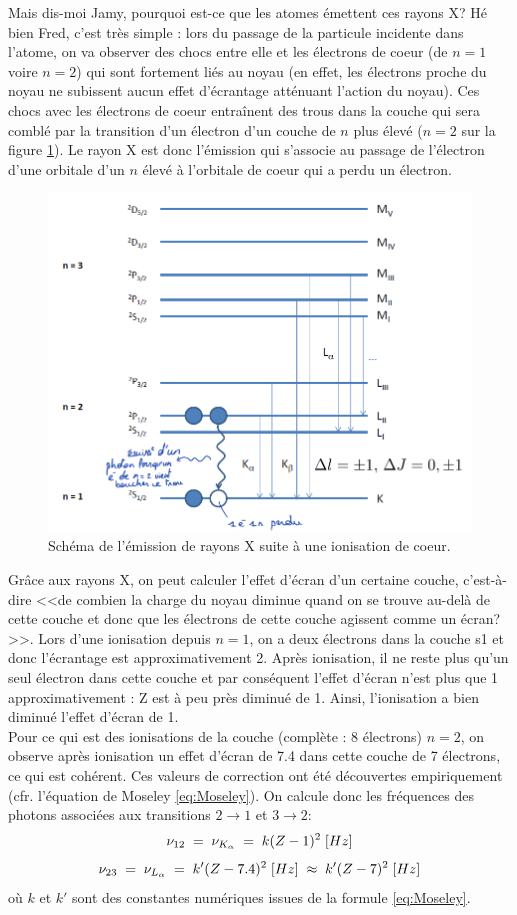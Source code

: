 Mais dis-moi Jamy, pourquoi est-ce que les atomes émettent ces rayons X? Hé bien Fred, c'est très simple : lors du passage de la particule incidente dans l'atome, on va observer des chocs entre elle et les électrons de coeur (de $n=1$ voire $n=2$) qui sont fortement liés au noyau (en effet, les électrons proche du noyau ne subissent aucun effet d'écrantage atténuant l'action du noyau). Ces chocs avec les électrons de coeur entraînent des trous dans la couche qui sera comblé par la transition d'un électron d'un couche de $n$ plus élevé ($n=2$ sur la figure \ref{fig:Rayons X}). Le rayon X est donc l'émission qui s'associe au passage de l'électron d'une orbitale d'un $n$ élevé à l'orbitale de coeur qui a perdu un électron.
\begin{figure}[tph]
    \centering
    \includegraphics[scale=0.8]{Images2/Rayons X.PNG}
    \caption{Schéma de l'émission de rayons X suite à une ionisation de coeur.}
    \label{fig:Rayons X}
\end{figure}
Grâce aux rayons X, on peut calculer l'effet d'écran d'un certaine couche, c'est-à-dire <<de combien la charge du noyau diminue quand on se trouve au-delà de cette couche et donc que les électrons de cette couche agissent comme un écran?>>. Lors d'une ionisation depuis $n=1$, on a deux électrons dans la couche s1 et donc l'écrantage est approximativement 2. Après ionisation, il ne reste plus qu'un seul électron dans cette couche et par conséquent l'effet d'écran n'est plus que 1 approximativement : Z est à peu près diminué de 1. Ainsi, l'ionisation a bien diminué l'effet d'écran de 1.\\
Pour ce qui est des ionisations de la couche (complète : 8 électrons) $n=2$, on observe après ionisation un effet d'écran de 7.4 dans cette couche de 7 électrons, ce qui est cohérent. Ces valeurs de correction ont été découvertes empiriquement (cfr. l'équation de Moseley \ref{eq:Moseley}).
On calcule donc les fréquences des photons associées aux transitions $2\rightarrow1$ et $3\rightarrow2$:
\[
    \nu_{12}
    \; = \; \nu_{K_\alpha}
    \; = \; k (Z - 1)^2 \;[Hz]
\]
\[
    \nu_{23}
    \; = \; \nu_{L_\alpha}
    \; = \; k' (Z - 7.4)^2 \;[Hz]
    \;\approx\;  k' (Z - 7)^2 \;[Hz]
\]
où $k$ et $k'$ sont des constantes numériques issues de la formule \ref{eq:Moseley}.



